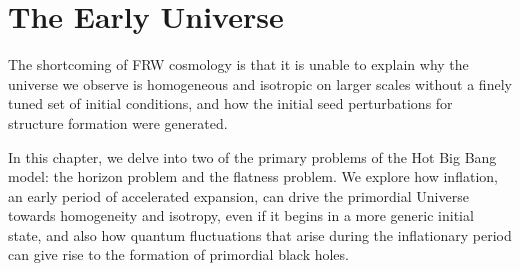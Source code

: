 \chapter{The Early Universe}
\hspace{0.5cm} The shortcoming  of FRW cosmology is that it is unable to explain why the universe we observe is homogeneous and isotropic on larger scales  without a finely tuned set of initial conditions, and how the initial seed perturbations for structure formation were generated.

In this chapter, we delve into two of the primary problems of the Hot Big Bang model: the horizon problem and the flatness problem. We explore how inflation, an early period of accelerated expansion, can drive the primordial Universe towards homogeneity and isotropy, even if it begins in a more generic initial state, and also how quantum fluctuations that arise during the inflationary period can give rise to the formation of primordial black holes.

